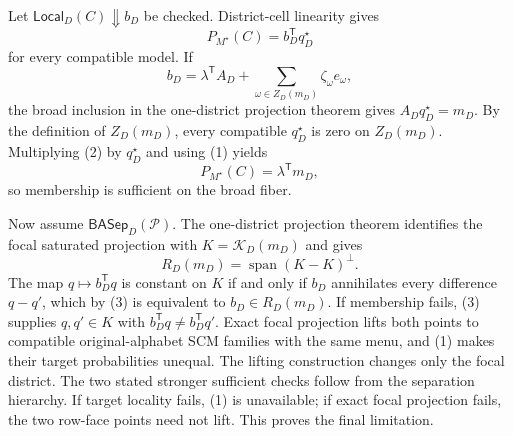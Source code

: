 Let \(\mathsf{Local}_D(C)\Downarrow b_D\) be checked.  District-cell linearity gives
\[
P_{M^\star}(C)=b_D^{\mathsf T}q_D^\star
\tag{1}
\]
for every compatible model.  If
\[
b_D=\lambda^{\mathsf T}A_D+
\sum_{\omega\in Z_D(m_D)}\zeta_\omega e_\omega,
\tag{2}
\]
the broad inclusion in the one-district projection theorem gives \(A_Dq_D^\star=m_D\).  By the definition of \(Z_D(m_D)\), every compatible \(q_D^\star\) is zero on \(Z_D(m_D)\).  Multiplying (2) by \(q_D^\star\) and using (1) yields
\[
P_{M^\star}(C)=\lambda^{\mathsf T}m_D,
\]
so membership is sufficient on the broad fiber.

Now assume \(\mathsf{BASep}_D(\mathcal P)\).  The one-district projection theorem identifies the focal saturated projection with \(K=\mathcal K_D(m_D)\) and gives
\[
R_D(m_D)=\operatorname{span}(K-K)^\perp.
\tag{3}
\]
The map \(q\mapsto b_D^{\mathsf T}q\) is constant on \(K\) if and only if \(b_D\) annihilates every difference \(q-q'\), which by (3) is equivalent to \(b_D\in R_D(m_D)\).  If membership fails, (3) supplies \(q,q'\in K\) with \(b_D^{\mathsf T}q\ne b_D^{\mathsf T}q'\).  Exact focal projection lifts both points to compatible original-alphabet SCM families with the same menu, and (1) makes their target probabilities unequal.  The lifting construction changes only the focal district.  The two stated stronger sufficient checks follow from the separation hierarchy.  If target locality fails, (1) is unavailable; if exact focal projection fails, the two row-face points need not lift.  This proves the final limitation.